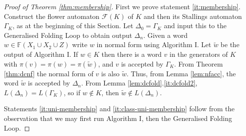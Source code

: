 \documentclass[a4paper,12pt]{article}
\newcommand{\G}{\Gamma }
\newcommand{\D}{\Delta }
\renewcommand{\L}{\Lambda }
\renewcommand{\S}{\Sigma }
\newcommand{\cA}{{\cal{A}}}
\newcommand{\cF}{{\cal{F}}}
\newtheorem{theorem}{Theorem}[section]
\numberwithin{equation}{section}
\numberwithin{figure}{section}
\newcommand{\FF}{\ensuremath{\mathbb{F}}}
\renewcommand{\cF}{\mathcal{F}}
\begin{document}

\begin{proof}[Proof of Theorem \ref{thm:membership}]
First we prove statement \ref{it:membership}.
Construct the flower automaton $\cF(K)$ of $K$ and then
its Stallings automaton $\G_K$,  as at the beginning of this Section. %
Let $\D_0=\G_K$ and input this to the Generalised Folding Loop to obtain output $\D_n$.
Given a word $w\in \FF(X_1\cup X_2\cup Z)$ write $w$ in normal form
using Algorithm I. Let $\tilde w$ be the output of Algorithm I. 
If $w\in K$ then there is a word $v$ in the generators
 of $K$ with $\pi(v)=\pi(w)=\pi(\tilde w)$, and $v$ is accepted by $\G_K$. 
From Theorem \ref{thm:dcnf} the normal form of $v$ is also $\tilde w$. 
Thus, 
from Lemma \ref{lem:nfacc}, the word $\tilde w$ is accepted by $\D_n$. From
Lemma \ref{lem:dcfold}.\ref{it:dcfold2}, $L(\D_n)=L(\G_K)$,
so if $w\notin K$, then
$\tilde w\notin L(\D_n)$.

Statements \ref{it:uni-membership} and \ref{it:class-uni-membership} follow
from the observation that we may
first run Algorithm I, then the Generalised Folding Loop.
\end{proof}
\end{document}
